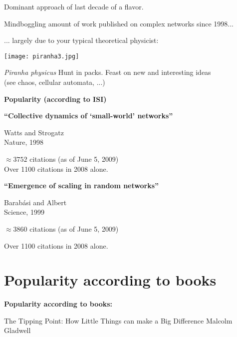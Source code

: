     Dominant approach of last decade of 
    a  flavor.
    
    Mindboggling amount of work published 
    on complex networks since 1998...
    
    ... largely due to your typical theoretical physicist:
          
      
      \smallskip
              
        \texttt{[image: piranha3.jpg]}
        
        
         \textit{Piranha physicus}
         Hunt in packs.
         Feast on new and interesting ideas \\
          {\small (see chaos, cellular automata, ...)}
        
            



  \textbf{Popularity (according to ISI)}

  \textbf{``Collective dynamics of `small-world' networks''\cite{watts1998a}}
    
     
      Watts and Strogatz\\
      Nature, 1998
     
      \alert{$\approx 3752$} citations {\tiny(as of June 5, 2009)}\\
     
      Over 1100 citations in 2008 alone.
    
  

  \textbf{``Emergence of scaling in random networks''\cite{barabasi1999a}}
    
     
      Barab\'{a}si and Albert\\
      Science, 1999
     
      \alert{$\approx 3860$} citations {\tiny(as of June 5, 2009)}
     
      Over 1100 citations in 2008 alone.
    
  

\section{Popularity according to books}

  \textbf{Popularity according to books:}

  {The Tipping Point: How Little Things can make a Big Difference}
  {Malcolm Gladwell\cite{gladwell2000a}}

